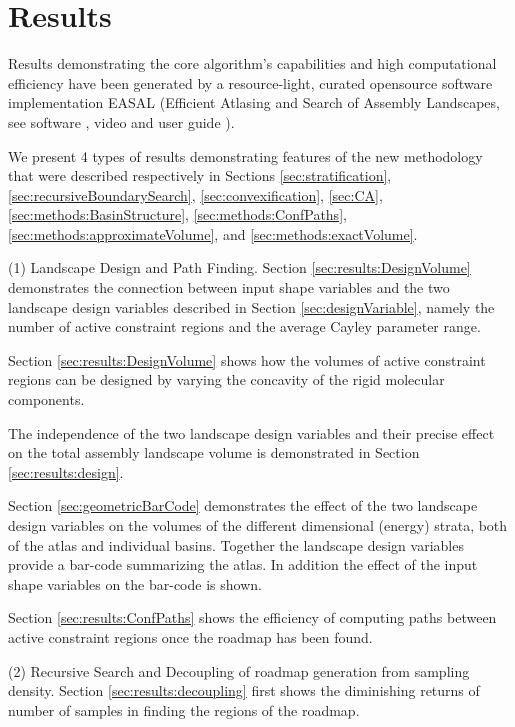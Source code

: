 \documentclass[]{article}
\newcommand{\rmc}{rigid molecular component}
\begin{document}
 \section{Results}
\label{sec:results}

Results demonstrating the core algorithm's capabilities and high computational
efficiency have been generated by a resource-light, curated opensource software
implementation EASAL \cite{Ozkan:toms} (Efficient Atlasing and Search of
Assembly Landscapes, see software \cite{easalSoftware}, video \cite{easalVideo}
and user guide \cite{easalUserGuide}). 

We present 4 types of results demonstrating features of the new methodology
that were described respectively in Sections \ref{sec:stratification},
\ref{sec:recursiveBoundarySearch}, \ref{sec:convexification}, \ref{sec:CA},
\ref{sec:methods:BasinStructure}, \ref{sec:methods:ConfPaths},
\ref{sec:methods:approximateVolume}, and \ref{sec:methods:exactVolume}.

(1) Landscape Design and Path Finding. Section \ref{sec:results:DesignVolume}
demonstrates the connection between input shape variables and the two landscape
design variables described in Section \ref{sec:designVariable}, namely the
number of active constraint regions and the average Cayley parameter range. 

Section \ref{sec:results:DesignVolume} shows how the volumes of active
constraint regions can be designed by varying the concavity of the \rmc s. 

The independence of the two landscape design variables and their precise effect
on the total assembly landscape volume is demonstrated in Section
\ref{sec:results:design}. 

Section
\ref{sec:geometricBarCode} demonstrates the effect of the two landscape design
variables on the volumes of the different dimensional (energy) strata, both of
the atlas and individual basins. Together the landscape design variables
provide a bar-code summarizing the atlas. In addition the effect of the input
shape variables on the bar-code is shown. 

Section \ref{sec:results:ConfPaths} shows the
efficiency of computing paths between active constraint regions once the roadmap
has been found.

(2) Recursive Search and Decoupling of roadmap generation from sampling
density. Section \ref{sec:results:decoupling} first shows the diminishing
returns of number of samples in finding the regions of the roadmap.
\end{document}
